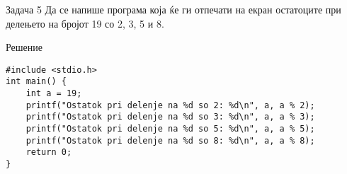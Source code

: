 \begin{frame}[fragile]{Задача 5}
Да се напише програма која ќе ги отпечати на екран остатоците при делењето на бројот 19 со 2, 3, 5 и 8.
    \begin{exampleblock}{Решение}
\begin{lstlisting}
#include <stdio.h>
int main() {
    int a = 19;
    printf("Ostatok pri delenje na %d so 2: %d\n", a, a % 2);
    printf("Ostatok pri delenje na %d so 3: %d\n", a, a % 3);
    printf("Ostatok pri delenje na %d so 5: %d\n", a, a % 5);
    printf("Ostatok pri delenje na %d so 8: %d\n", a, a % 8);
    return 0;
}
\end{lstlisting}
    \end{exampleblock}
\end{frame}
